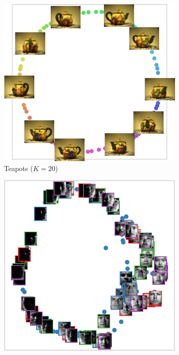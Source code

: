 \documentclass[twoside,11pt]{article}
\begin{document}
\begin{figure}[p]
	\centering
	\begin{subfigure}[t]{.252\textwidth}
		\centering
		\includegraphics[width=\linewidth]{embedding/teapots_embedding}
		
		\caption{Teapots ($K = 20$)}
		\label{fig:embedding_real_teapot}
	\end{subfigure}%
	\hfill%
	\begin{subfigure}[t]{.24\textwidth}
		\centering
		\includegraphics[width=\linewidth]{embedding/yale1-4-5-27_embedding}
		

\end{subfigure}
\end{figure}
\end{document}
